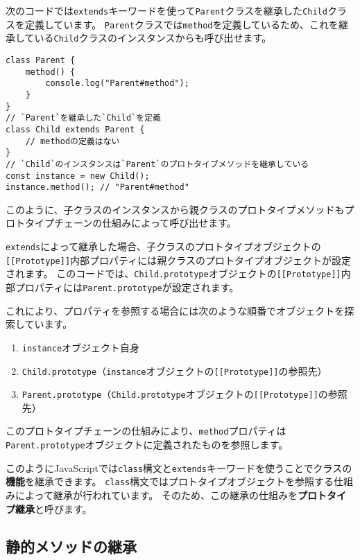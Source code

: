 次のコードでは\texttt{extends}キーワードを使って\texttt{Parent}クラスを継承した\texttt{Child}クラスを定義しています。
\texttt{Parent}クラスでは\texttt{method}を定義しているため、これを継承している\texttt{Child}クラスのインスタンスからも呼び出せます。

\begin{lstlisting}
class Parent {
    method() {
        console.log("Parent#method");
    }
}
// `Parent`を継承した`Child`を定義
class Child extends Parent {
    // methodの定義はない
}
// `Child`のインスタンスは`Parent`のプロトタイプメソッドを継承している
const instance = new Child();
instance.method(); // "Parent#method"
\end{lstlisting}

このように、子クラスのインスタンスから親クラスのプロトタイプメソッドもプロトタイプチェーンの仕組みによって呼び出せます。

\texttt{extends}によって継承した場合、子クラスのプロトタイプオブジェクトの\texttt{[[Prototype]]}内部プロパティには親クラスのプロトタイプオブジェクトが設定されます。
このコードでは、\texttt{Child.prototype}オブジェクトの\texttt{[[Prototype]]}内部プロパティには\texttt{Parent.prototype}が設定されます。

これにより、プロパティを参照する場合には次のような順番でオブジェクトを探索しています。

\begin{enumerate}
\def\labelenumi{\arabic{enumi}.}
\item
  \texttt{instance}オブジェクト自身
\item
  \texttt{Child.prototype}（\texttt{instance}オブジェクトの\texttt{[[Prototype]]}の参照先）
\item
  \texttt{Parent.prototype}（\texttt{Child.prototype}オブジェクトの\texttt{[[Prototype]]}の参照先）
\end{enumerate}

このプロトタイプチェーンの仕組みにより、\texttt{method}プロパティは\texttt{Parent.prototype}オブジェクトに定義されたものを参照します。

このようにJavaScriptでは\texttt{class}構文と\texttt{extends}キーワードを使うことでクラスの\textbf{機能}を継承できます。
\texttt{class}構文ではプロトタイプオブジェクトを参照する仕組みによって継承が行われています。
そのため、この継承の仕組みを\textbf{プロトタイプ継承}と呼びます。

\hypertarget{static-inheritance}{%
\subsection{静的メソッドの継承}\label{static-inheritance}}

